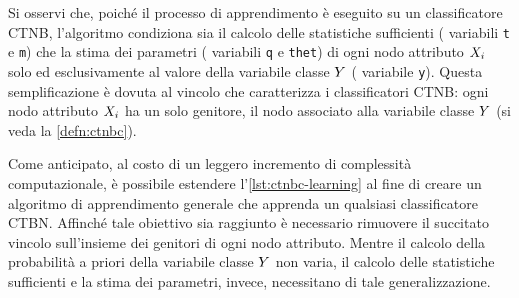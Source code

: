 Si osservi che, poiché il processo di apprendimento è eseguito su un classificatore \acs{CTNB}, l'algoritmo condiziona sia il calcolo delle statistiche sufficienti (\ie{} variabili \lstinline[]|t| e \lstinline[]|m|) che la stima dei parametri (\ie{} variabili \lstinline[]|q| e \lstinline[]|thet|) di ogni nodo attributo $\mathnormal{X}_i$ solo ed esclusivamente al valore della variabile classe $\mathnormal{Y}$ (\ie{} variabile \lstinline[]|y|). Questa semplificazione è dovuta al vincolo che caratterizza i classificatori \acs{CTNB}: ogni nodo attributo $\mathnormal{X}_i$ ha un solo genitore, il nodo associato alla variabile classe $\mathnormal{Y}$ (si veda la \autoref{defn:ctnbc}).

Come anticipato, al costo di un leggero incremento di complessità computazionale, è possibile estendere l'\autoref{lst:ctnbc-learning} al fine di creare un algoritmo di apprendimento generale che apprenda un qualsiasi classificatore \acs{CTBN}. Affinché tale obiettivo sia raggiunto è necessario rimuovere il succitato vincolo sull'insieme dei genitori di ogni nodo attributo. Mentre il calcolo della probabilità a priori della variabile classe $\mathnormal{Y}$ non varia, il calcolo delle statistiche sufficienti e la stima dei parametri, invece, necessitano di tale generalizzazione.


